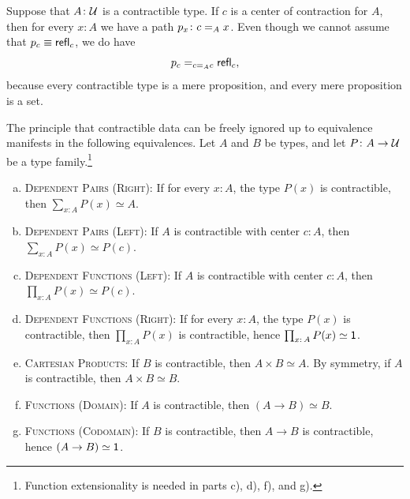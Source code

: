 \begin{rem}\label{rem:contractible-center-to-center-path}
    Suppose that $A\colon\univ$ is a contractible type. If $c$ is a center of contraction for $A$, then for every $x\colon A$ we have a path $p_x\colon c\eq Ax$. Even though we cannot assume that $p_c\equiv\mathsf{refl}_c$, we do have
    \[
        p_c\mathrel{=_{c\mathrel{=_{A}}c}}\mathsf{refl}_c,
    \]
    because every contractible type is a mere proposition, and every mere proposition is a set.
\end{rem}

\begin{thm}\fe\label{thm:contractible-data-ignored}
    The principle that contractible data can be freely ignored up to equivalence manifests in the following equivalences. Let\/ $A$ and\/ $B$ be types, and let\/ $P\colon A\to\univ$ be a type family.\footnote{Function extensionality is needed in parts c), d), f), and g).}
    \begin{enumerate}[a),font=\upshape]
        \item \textsc{\upshape Dependent Pairs (Right):} If for every\/ $x\colon A$, the type\/ $P(x)$ is contractible, then\/ $\sum_{x\colon A}P(x)\simeq A$.
        
        \item \textsc{\upshape Dependent Pairs (Left):} If\/ $A$ is contractible with center\/ $c\colon A$, then\/ $\sum_{x\colon A}P(x)\simeq P(c)$.
        
        \item \textsc{\upshape Dependent Functions (Left):} If\/ $A$ is contractible with center\/ $c\colon A$, then\/ $\prod_{x\colon A}P(x)\simeq P(c)$.
        
        \item \textsc{\upshape Dependent Functions (Right):} If for every\/ $x\colon A$, the type\/ $P(x)$ is contractible, then\/ $\prod_{x\colon A}P(x)$ is contractible, hence\/ $\prod_{x\colon A}P(x)\simeq\fun1$.
        
        \item \textsc{\upshape Cartesian Products:} If\/ $B$ is contractible, then\/ $A\times B\simeq A$. By symmetry, if\/ $A$ is contractible, then\/ $A\times B\simeq B$.
        
        \item \textsc{\upshape Functions (Domain):} If\/ $A$ is contractible, then\/ $(A\to B)\simeq B$.
        
        \item \textsc{\upshape Functions (Codomain):} If\/ $B$ is contractible, then\/ $A\to B$ is contractible, hence\/ $(A\to B)\simeq\mathsf{1}$.
    \end{enumerate}
\end{thm}


